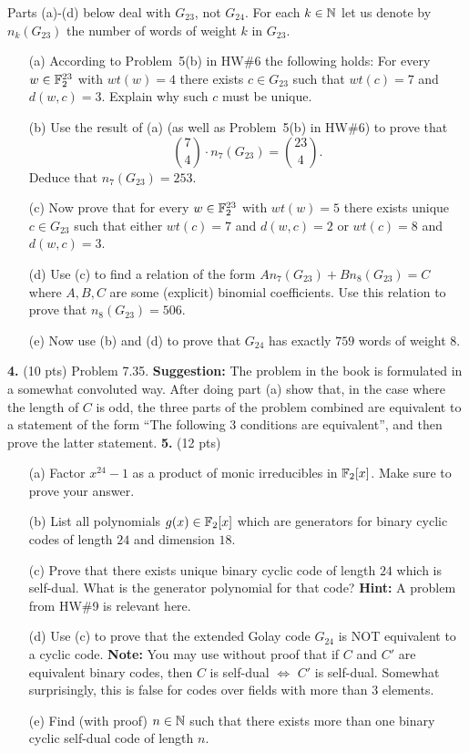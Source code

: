 \documentclass[12pt]{amsart}
\begin{document}
Parts (a)-(d) below deal with $G_{23}$, not $G_{24}$. For each $k\in{\mathbb N}$ let us denote by $n_k(G_{23})$ the number of words of weight $k$ in $G_{23}$.
\vfill 
\begin{itemize}
\item[(a)] According to Problem~5(b) in HW\#6 the following holds: For every $w\in {\mathbb F}_2^{23}$ with $wt(w)=4$ there exists $c\in G_{23}$
such that $wt(c)=7$ and $d(w,c)=3$. Explain why such $c$ must be unique.
\item[(b)] Use the result of (a) (as well as Problem~5(b) in HW\#6) to prove that $${7 \choose 4}\cdot n_{7}(G_{23})={23 \choose 4}.$$ Deduce that
$n_7(G_{23})=253$.
\item[(c)] Now prove that for every $w\in {\mathbb F}_2^{23}$ with $wt(w)=5$ there exists unique $c\in G_{23}$ such that either $wt(c)=7$ and $d(w,c)=2$ or $wt(c)=8$ and $d(w,c)=3$. 
\item[(d)] Use (c) to find a relation of the form $A n_7(G_{23}) + B n_8(G_{23})=C$ where $A,B,C$ are some (explicit) binomial coefficients. Use this relation to prove that $n_8(G_{23})=506$.
\item[(e)] Now use (b) and (d) to prove that $G_{24}$ has exactly $759$ words of weight $8$.
\end{itemize}
\skv
{\bf 4.} (10 pts) Problem 7.35. {\bf Suggestion:} The problem in the book is formulated in a somewhat convoluted way. After doing part (a) show that, in the case where the length of $C$ is odd, the three parts of the problem combined are equivalent to a statement of the form ``The following 3 conditions are equivalent'', and then prove the latter statement. 
\skv
{\bf 5.} (12 pts)
\begin{itemize}
\item[(a)] Factor $x^{24}-1$ as a product of monic irreducibles in ${\mathbb F}_2[x]$. Make sure to prove your answer.
\item[(b)] List all polynomials $g(x)\in {\mathbb F}_2[x]$ which are generators for binary cyclic codes of length $24$ and dimension $18$.
\item[(c)] Prove that there exists unique binary cyclic code of length $24$ which is self-dual. What is the generator polynomial for that code? {\bf Hint:} A problem from HW\#9 is relevant here.
\item[(d)] Use (c) to prove that the extended Golay code $G_{24}$ is NOT equivalent to a cyclic code. {\bf Note:} You may use without proof that if $C$ and $C'$ are equivalent binary codes, then $C$ is self-dual $\iff$ $C'$ is self-dual. Somewhat surprisingly, this is false for codes over fields with more than 3 elements.
\item[(e)] Find (with proof) $n\in{\mathbb N}$ such that there exists more than one binary cyclic self-dual code of length $n$.
\end{itemize}
\end{document}

